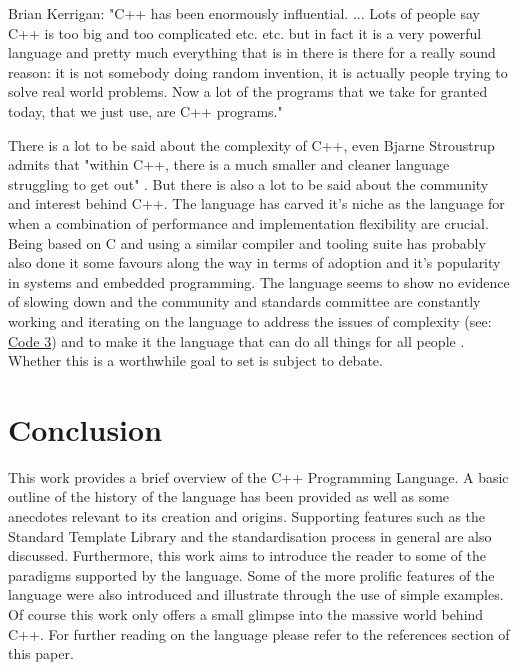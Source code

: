\documentclass[conference, a4paper]{IEEEtran}
\begin{document}
Brian Kerrigan:
"C++ has been enormously influential. ... Lots of people say C++ is too big and too complicated etc. etc. but in fact it is a very powerful language and pretty much everything that is in there is there for a really sound reason: it is not somebody doing random invention, it is actually people trying to solve real world problems. Now a lot of the programs that we take for granted today, that we just use, are C++ programs." \cite{bkcomputerphile}

There is a lot to be said about the complexity of C++, even Bjarne Stroustrup admits that "within C++, there is a much smaller and cleaner language struggling to get out" \cite{cppquotes}. But there is also a lot to be said about the community and interest behind C++. The language has carved it's niche as the language for when a combination of performance and implementation flexibility are crucial. Being based on C and using a similar compiler and tooling suite has probably also done it some favours along the way in terms of adoption and it's popularity in systems and embedded programming. The language seems to show no evidence of slowing down and the community and standards committee are constantly working and iterating on the language to address the issues of complexity (see: \hyperref[listing:3]{Code 3}) and to make it the language that can do all things for all people . Whether this is a worthwhile goal to set is subject to debate. 

\section{Conclusion}

This work provides a brief overview of the C++ Programming Language. A basic outline of the history of the language has been provided as well as some anecdotes relevant to its creation and origins. Supporting features such as the Standard Template Library and the standardisation process in general are also discussed. Furthermore, this work aims to introduce the reader to some of the paradigms supported by the language. Some of the more prolific features of the language were also introduced and illustrate through the use of simple examples. Of course this work only offers a small glimpse into the massive world behind C++. For further reading on the language please refer to the references section of this paper.




\phantom{\cite{*}}

\end{document}
